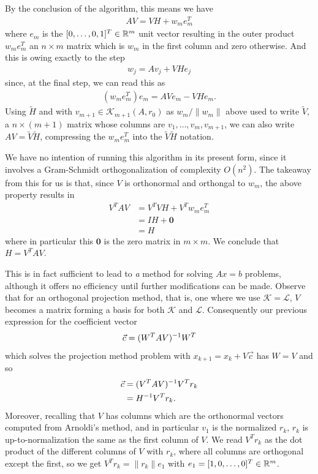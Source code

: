 \documentclass[11pt]{article}
\begin{document}
By the conclusion of the algorithm, this means we have \begin{gather*}
A V = V H + w_{m} e_m^T
\end{gather*}
where $e_m$ is the $[0,\dots, 0, 1]^T \in \mathbb{R}^m$ unit vector resulting in the outer product $w_m e_m^T$ an $n \times m$ matrix which is $w_m$ in the first column and zero otherwise. And this is owing exactly to the step \begin{gather*}
w_j = Av_j + V H e_j
\end{gather*}
since, at the final step, we can read this as \begin{gather*}
(w_m e_m^T) e_m = AV e_m  - V H e_m.
\end{gather*}
Using $\tilde H$ and with $v_{m+1} \in \mathcal{K}_{m+1} (A,r_0)$ as $w_m / \lVert w_m \rVert$ above used to write $\tilde V$, a $n \times (m+1) $ matrix whose columns are $v_1, \dots, v_m, v_{m+1}$, we can also write $AV = \tilde V \tilde H$, compressing the $w_m e_m^T$ into the $\tilde V \tilde H$ notation.

We have no intention of running this algorithm in its present form, since it involves a Gram-Schmidt orthogonalization of complexity $O(n^2)$. The takeaway from this for us is that, since $V$ is orthonormal and orthongal to $w_m$, the above property results in \begin{align*}
V^T A V &= V^T V H + V^T w_m e_m^T \\
&= I H + \mathbf{0} \\
&= H
\end{align*} 
where in particular this $\mathbf{0}$ is the zero matrix in $m \times m$. We conclude that $H = V^T A V$.

This is in fact sufficient to lead to \emph{a} method for solving $Ax=b$ problems, although it offers no efficiency until further modifications can be made. Observe that for an orthogonal projection method, that is, one where we use $\mathcal K = \mathcal L$, $V$ becomes a matrix forming a basis for both $\mathcal K$ and $\mathcal L$. Consequently our previous expression for the coefficient vector \begin{gather*}
\vec c = (W^T A V)^{-1} W^T 
\end{gather*}
which solves the projection method problem with $x_{k+1} = x_k + V \vec c$ has $W = V$ and so \begin{align*}
\vec c &= (V^T A V)^{-1} V^T r_k \\
&= H^{-1} V^T r_k.
\end{align*}
Moreover, recalling that $V$ has columns which are the orthonormal vectors computed from Arnoldi's method, and in particular $v_1$ is the normalized $r_k$, $r_k$ is up-to-normalization the same as the first column of $V$. We read $V^T r_k$ as the dot product of the different columns of $V$ with $r_k$, where all columns are orthogonal except the first, so we get $V^T r_k = \lVert r_k \rVert e_1$ with $e_1 = [1,0,\dots,0]^T \in \mathbb{R}^m$.
\end{document}
